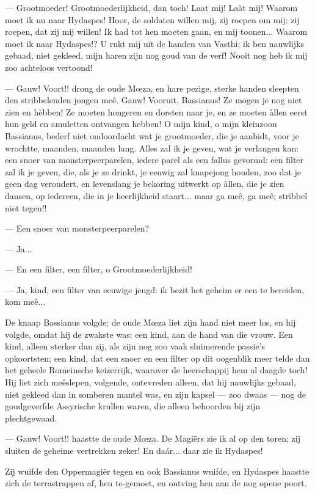 \documentclass[a4paper, 12pt, oneside, dutch]{article}
\begin{document}
--- Grootmoeder! Grootmoederlijkheid, dan toch! Laat mij! Laàt mij! Waarom moet ik nu naar Hydaspes! Hoor, de soldaten willen mij, zij roepen om mij: zij roepen, dat zij mij willen! Ik had tot hen moeten gaan, en mij toonen... Waarom moet ik naar Hydaspes!? U rukt mij uit de handen van Vasthi; ik ben nauwlijks gebaad, niet gekleed, mijn haren zijn nog goud van de verf! Nooit nog heb ik mij zoo achteloos vertoond!

--- Gauw! Voort!! drong de oude Mœza, en hare pezige, sterke handen sleepten den stribbelenden jongen meê. Gauw! Vooruit, Bassianus! Ze mogen je nog niet zien en hèbben! Ze moeten hongeren en dorsten naar je, en ze moeten àllen eerst hun geld en amuletten ontvangen hebben! O mijn kind, o mijn kleinzoon Bassianus, bederf niet ondoordacht wat je grootmoeder, die je aanbidt, voor je wrochtte, maanden, maanden lang. Alles zal ik je geven, wat je verlangen kan: een snoer van monsterpeerparelen, iedere parel als een fallus gevormd: een filter zal ik je geven, die, als je ze drinkt, je eeuwig zal knapejong houden, zoo dat je geen dag veroudert, en levenslang je bekoring uitwerkt op àllen, die je zien dansen, op iedereen, die in je heerlijkheid staart... maar ga meê, ga meê; stribbel niet tegen!!

--- Een snoer van monsterpeerparelen?

--- Ja...

--- En een filter, een filter, o Grootmoederlijkheid!

--- Ja, kind, een filter van eeuwige jeugd: ik bezit het geheim er een te bereiden, kom meê...

De knaap Bassianus volgde; de oude Mœza liet zijn hand niet meer los, en hij volgde, omdat hij de zwakste was: een kind, aan de hand van die vrouw. Een kind, alleen sterker dan zij, als zijn nog zoo vaak sluimerende passie's opkoortsten; een kind, dat een snoer en een filter op dit oogenblik meer telde dan het geheele Romeinsche keizerrijk, waarover de heerschappij hem al daagde toch! Hij liet zich meêslepen, volgende, ontevreden alleen, dat hij nauwlijks gebaad, niet gekleed dan in somberen mantel was, en zijn kapsel --- zoo dwaas --- nog de goudgeverfde Assyrische krullen waren, die alleen behoorden bij zijn plechtgewaad.

--- Gauw! Voort!! haastte de oude Mœza. De Magiërs zie ik al op den toren; zij sluiten de geheime vertrekken zeker! En daár... daar zie ik Hydaspes!

Zij wuifde den Oppermagiër tegen en ook Bassianus wuifde, en Hydaspes haastte zich de terrastrappen af, hen te-gemoet, en ontving hen aan de nog opene poort.
\end{document}
